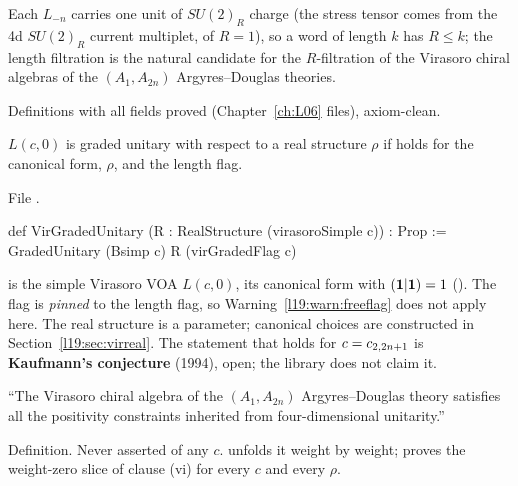 \begin{physics}
Each $L_{-n}$ carries one unit of $SU(2)_R$ charge (the stress tensor comes from the 4d
$SU(2)_R$ current multiplet, of $R=1$), so a word of length $k$ has $R\le k$; the length filtration is
the natural candidate for the $R$-filtration of the Virasoro chiral algebras of the
$(A_1,A_{2n})$ Argyres--Douglas theories.
\end{physics}

\begin{status}
Definitions with all fields proved (Chapter~\ref{ch:L06} files), axiom-clean.
\end{status}

\begin{definition}\label{l19:def:virgu}
$L(c,0)$ is graded unitary with respect to a real structure $\rho$ if
 holds for the canonical form, $\rho$, and the length flag.
\end{definition}

\noindent File .
\begin{leancode}
def VirGradedUnitary (R : RealStructure (virasoroSimple c)) : Prop :=
  GradedUnitary (Bsimp c) R (virGradedFlag c)
\end{leancode}

\begin{dictionary}
 is the simple Virasoro VOA $L(c,0)$,  its canonical form with
$(\mathbf{1}|\mathbf{1}) = 1$ (). The flag is \emph{pinned} to the length flag,
so Warning~\ref{l19:warn:freeflag} does not apply here. The real structure is a parameter; canonical
choices are constructed in Section~\ref{l19:sec:virreal}. The statement that
 holds for $c = c_{2,2n+1}$ is \textbf{Kaufmann's
conjecture} (1994), open; the library does not claim it.
\end{dictionary}

\begin{physics}
``The Virasoro chiral algebra of the $(A_1,A_{2n})$ Argyres--Douglas theory satisfies all the
positivity constraints inherited from four-dimensional unitarity.''
\end{physics}

\begin{status}
Definition. Never asserted of any $c$.  unfolds it weight by weight;
\allowbreak{}\allowbreak{}\allowbreak{}\allowbreak{} proves the weight-zero slice of clause (vi) for every $c$ and
every $\rho$.
\end{status}

